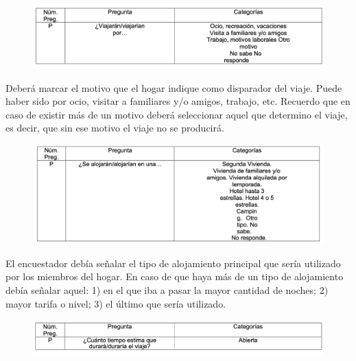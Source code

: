 \documentclass[
  openany]{book}
\begin{document}
\begin{figure}

{\centering \includegraphics[width=1\linewidth]{imagenes/figura6-311} 

}

\end{figure}

Deberá marcar el motivo que el hogar indique como disparador del viaje. Puede haber sido por ocio, visitar a familiares y/o amigos, trabajo, etc. Recuerdo que en caso de existir más de un motivo deberá seleccionar aquel que determino el viaje, es decir, que sin ese motivo el viaje no se producirá.

\begin{figure}

{\centering \includegraphics[width=1\linewidth]{imagenes/figura6-312} 

}

\end{figure}

El encuestador debía señalar el tipo de alojamiento principal que sería utilizado por los miembros del hogar. En caso de que haya más de un tipo de alojamiento debía señalar aquel: 1) en el que iba a pasar la mayor cantidad de noches; 2) mayor tarifa o nivel; 3) el último que sería utilizado.

\begin{figure}

{\centering \includegraphics[width=1\linewidth]{imagenes/figura6-313} 

}

\end{figure}
\end{document}
